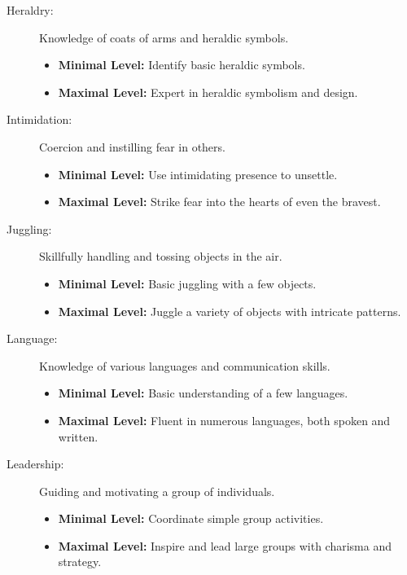 \documentclass[12pt]{book}  %
\begin{document}
\begin{description}
    \item[Heraldry:] Knowledge of coats of arms and heraldic symbols.
        \begin{itemize}
            \item \textbf{Minimal Level:} Identify basic heraldic symbols.
            \item \textbf{Maximal Level:} Expert in heraldic symbolism and design.
        \end{itemize}

    \item[Intimidation:] Coercion and instilling fear in others.
        \begin{itemize}
            \item \textbf{Minimal Level:} Use intimidating presence to unsettle.
            \item \textbf{Maximal Level:} Strike fear into the hearts of even the bravest.
        \end{itemize}

    \item[Juggling:] Skillfully handling and tossing objects in the air.
        \begin{itemize}
            \item \textbf{Minimal Level:} Basic juggling with a few objects.
            \item \textbf{Maximal Level:} Juggle a variety of objects with intricate patterns.
        \end{itemize}

    \item[Language:] Knowledge of various languages and communication skills.
        \begin{itemize}
            \item \textbf{Minimal Level:} Basic understanding of a few languages.
            \item \textbf{Maximal Level:} Fluent in numerous languages, both spoken and written.
        \end{itemize}

    \item[Leadership:] Guiding and motivating a group of individuals.
        \begin{itemize}
            \item \textbf{Minimal Level:} Coordinate simple group activities.
            \item \textbf{Maximal Level:} Inspire and lead large groups with charisma and strategy.
        \end{itemize}


\end{description}
\end{document}
